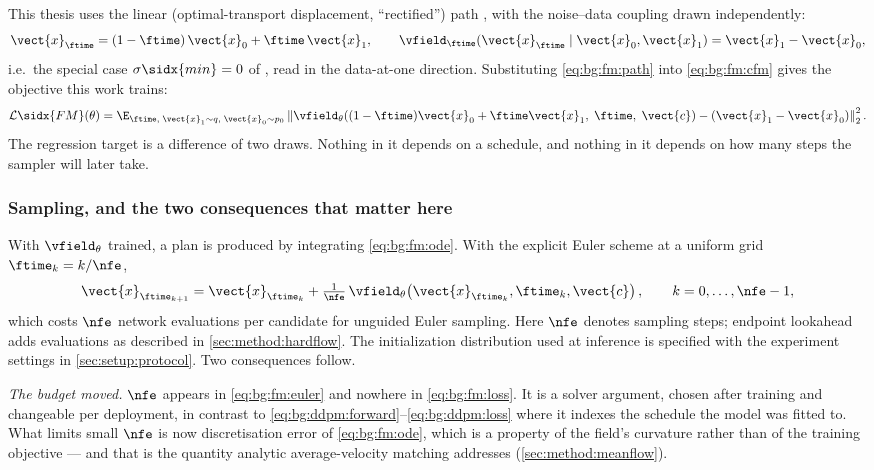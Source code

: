 This thesis uses the linear (optimal-transport displacement, ``rectified'')
path \parencite{lipman2023flow,liu2023flow}, with the noise--data coupling drawn independently:
\begin{equation}\label{eq:bg:fm:path}
  \vect{x}_{\ftime} = (1-\ftime)\,\vect{x}_{0} + \ftime\,\vect{x}_{1},
  \qquad
  \vfield_{\ftime}(\vect{x}_{\ftime}\mid \vect{x}_{0},\vect{x}_{1}) = \vect{x}_{1} - \vect{x}_{0},
\end{equation}
i.e.\ the special case $\sigma\sidx{min} = 0$ of \parencite[Eq.~(20)--(23)]{lipman2023flow}, read in
the data-at-one direction. Substituting \eqref{eq:bg:fm:path} into \eqref{eq:bg:fm:cfm} gives
the objective this work trains:
\begin{equation}\label{eq:bg:fm:loss}\label{eq:method:engine:fm}
  \mathcal{L}\sidx{FM}(\theta)
  = \E_{\ftime,\;\vect{x}_{1}\sim q,\;\vect{x}_{0}\sim p_{0}}
    \left\|\vfield_{\theta}\!\left((1-\ftime)\vect{x}_{0} + \ftime\vect{x}_{1},\;\ftime,\;\vect{c}\right)
      - \left(\vect{x}_{1}-\vect{x}_{0}\right)\right\|_{2}^{2}.
\end{equation}
The regression target is a difference of two draws. Nothing in it depends on a schedule, and
nothing in it depends on how many steps the sampler will later take.

\subsubsection*{Sampling, and the two consequences that matter here}

With $\vfield_{\theta}$ trained, a plan is produced by integrating \eqref{eq:bg:fm:ode}. With
the explicit Euler scheme at a uniform grid $\ftime_{k} = k/\nfe$,
\begin{equation}\label{eq:bg:fm:euler}
  \vect{x}_{\ftime_{k+1}} = \vect{x}_{\ftime_{k}}
    + \tfrac{1}{\nfe}\,\vfield_{\theta}\!\left(\vect{x}_{\ftime_{k}},\ftime_{k},\vect{c}\right),
  \qquad k = 0,\dots,\nfe-1,
\end{equation}
which costs $\nfe$ network evaluations per candidate for unguided Euler sampling. Here $\nfe$
denotes sampling steps; endpoint lookahead adds evaluations as described in
\autoref{sec:method:hardflow}. The initialization distribution used at inference is specified with
the experiment settings in \autoref{sec:setup:protocol}. Two consequences follow.

\emph{The budget moved.} $\nfe$ appears in \eqref{eq:bg:fm:euler} and nowhere in
\eqref{eq:bg:fm:loss}. It is a solver argument, chosen after training and changeable per
deployment, in contrast to \eqref{eq:bg:ddpm:forward}--\eqref{eq:bg:ddpm:loss} where it
indexes the schedule the model was fitted to. What limits small $\nfe$ is now discretisation
error of \eqref{eq:bg:fm:ode}, which is a property of the field's curvature rather than of the
training objective --- and that is the quantity analytic average-velocity matching addresses
(\autoref{sec:method:meanflow}).

